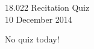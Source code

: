 \documentclass[11pt]{article}
\theoremstyle{definition}
\begin{document}
\thispagestyle{empty}

\begin{center}
  18.022 Recitation Quiz \iftoggle{solutions}{(with solutions)}{} \\
  10 December 2014 \\
\end{center}

No quiz today! 
\end{document}
